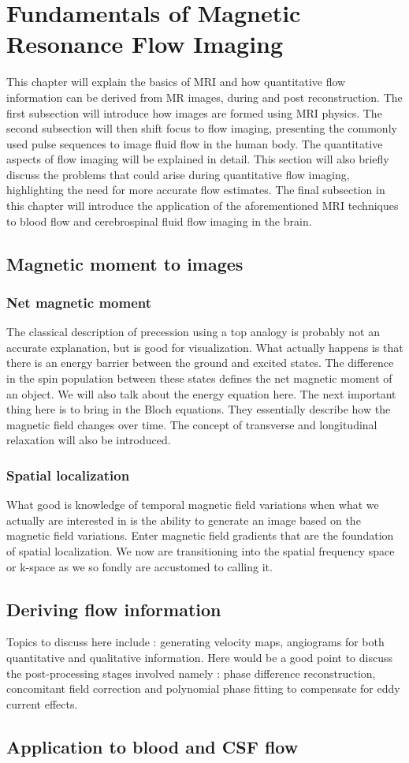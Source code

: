 \chapter{Fundamentals of Magnetic Resonance Flow Imaging}
This chapter will explain the basics of MRI and how quantitative flow information can be derived from MR images, during and post reconstruction. The first subsection will introduce how images are formed using MRI physics. The second subsection will then shift focus to flow imaging, presenting the commonly used pulse sequences to image fluid flow in the human body. The quantitative aspects of flow imaging will be explained in detail. This section will also briefly discuss the problems that could arise during quantitative flow imaging, highlighting the need for more accurate flow estimates. The final subsection in this chapter will introduce the application of the aforementioned MRI techniques to blood flow and cerebrospinal fluid flow imaging in the brain. 

\section{Magnetic moment to images}
\subsection{Net magnetic moment }
The classical description of precession using a top analogy is probably not an accurate explanation, but is good for visualization. What actually happens is that there is an energy barrier between the ground and excited states. The difference in the spin population between these states defines the net magnetic moment of an object. We will also talk about the energy equation here. The next important thing here is to bring in the Bloch equations. They essentially describe how the magnetic field changes over time. The concept of transverse and longitudinal relaxation will also be introduced. 
\subsection{Spatial localization}
What good is knowledge of temporal magnetic field variations when what we actually are interested in is the ability to generate an image based on the magnetic field variations. Enter magnetic field gradients that are the foundation of spatial localization. We now are transitioning into the spatial frequency space or k-space as we so fondly are accustomed to calling it. 
\section{Deriving flow information}
Topics to discuss here include : generating velocity maps, angiograms for both quantitative and qualitative information. Here would be a good point to discuss the post-processing stages involved namely : phase difference reconstruction, concomitant field correction and polynomial phase fitting to compensate for eddy current effects. 
\section{Application to blood and CSF flow}